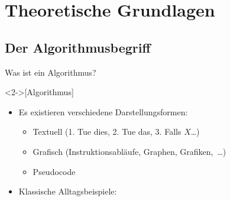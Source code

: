 \section{Theoretische Grundlagen}
\subsection{Der Algorithmusbegriff}
\begin{frame}{Was ist ein Algorithmus?}
    \begin{definition}<2->[Algorithmus]
    \end{definition}
    \begin{itemize}
        \widei
        \item<4-> Es existieren verschiedene Darstellungsformen: \begin{itemize}
            \item<5-> Textuell (1. Tue dies, 2. Tue das, 3. Falls \(X\)\ldots)
            \item<6-> Grafisch (Instruktionsabläufe, Graphen, Grafiken,~\ldots)
            \item<7-> Pseudocode
        \end{itemize}
        \item<8-> Klassische Alltagsbeispiele: 
    \end{itemize}
\end{frame}

